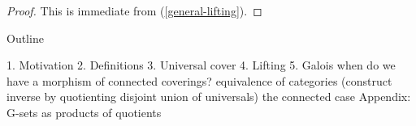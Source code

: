 \begin{proof}
  This is immediate from (\ref{general-lifting}).
\end{proof}


\nocite{may-concise, munkres}






Outline

1. Motivation
2. Definitions
3. Universal cover
4. Lifting
5. Galois
   when do we have a morphism of connected coverings?
   equivalence of categories (construct inverse by quotienting
   disjoint union of universals)
   the connected case
Appendix: G-sets as products of quotients

